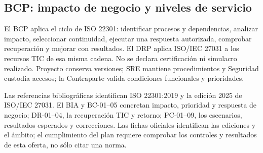 \subsection{BCP: impacto de negocio y niveles de servicio}\label{sec:sd8-bcp-bia}
El BCP aplica el ciclo de ISO 22301: identificar procesos y dependencias, analizar impacto, seleccionar continuidad, ejecutar una respuesta autorizada, comprobar recuperación y mejorar con resultados. El DRP aplica ISO/IEC 27031 a los recursos TIC de esa misma cadena. No se declara certificación ni simulacro realizado. Proyecto conserva versiones; SRE mantiene procedimientos y Seguridad custodia accesos; la Contraparte valida condiciones funcionales y prioridades. \parencites[Formulario T-7, apartado 10; arts.~20 y 78; pp.~14--15, 40, 59]{sd8-ba}[RT-10.02--04; p.~22]{sd8-bt}

Las referencias bibliográficas identifican ISO 22301:2019 y la edición 2025 de ISO/IEC 27031. El BIA y BC-01--05 concretan impacto, prioridad y respuesta de negocio; DR-01--04, la recuperación TIC y retorno; PC-01--09, los escenarios, resultados esperados y correcciones. Las fichas oficiales identifican las ediciones y el ámbito; el cumplimiento del plan requiere comprobar los controles y resultados de esta oferta, no sólo citar una norma. \parencites{sd8-iso22301}{sd8-iso27031}

